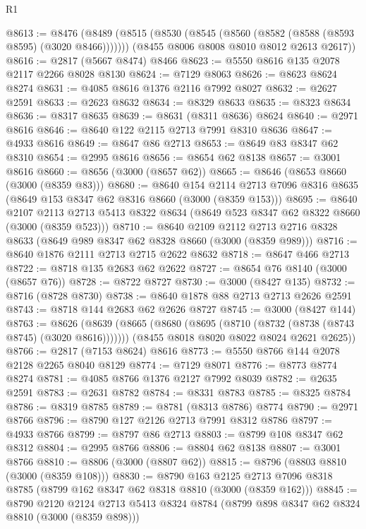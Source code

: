 \begin{lexlean}{R1}
\begin{coremodule}
@8613 := @8476
    (@8489
      (@8515 (@8530 (@8545 (@8560 (@8582 (@8588 (@8593 @8595) (@3020 @8466)))))))
      (@8455 @8006 @8008 @8010 @8012 @2613 @2617))
@8616 := @2817 (@5667 @8474) @8466
@8623 := @5550 @8616 @135 @2078 @2117 @2266 @8028 @8130
@8624 := @7129 @8063
@8626 := @8623 @8624 @8274
@8631 := @4085 @8616 @1376 @2116 @7992 @8027
@8632 := @2627 @2591
@8633 := @2623 @8632
@8634 := @8329 @8633
@8635 := @8323 @8634
@8636 := @8317 @8635
@8639 := @8631 (@8311 @8636) @8624
@8640 := @2971 @8616
@8646 := @8640 @122 @2115 @2713 @7991 @8310 @8636
@8647 := @4933 @8616
@8649 := @8647 @86 @2713
@8653 := @8649 @83 @8347 @62 @8310
@8654 := @2995 @8616
@8656 := @8654 @62 @8138
@8657 := @3001 @8616
@8660 := @8656 (@3000 (@8657 @62))
@8665 := @8646 (@8653 @8660 (@3000 (@8359 @83)))
@8680 := @8640
    @154
    @2114
    @2713
    @7096
    @8316
    @8635
    (@8649 @153 @8347 @62 @8316 @8660 (@3000 (@8359 @153)))
@8695 := @8640
    @2107
    @2113
    @2713
    @5413
    @8322
    @8634
    (@8649 @523 @8347 @62 @8322 @8660 (@3000 (@8359 @523)))
@8710 := @8640
    @2109
    @2112
    @2713
    @2716
    @8328
    @8633
    (@8649 @989 @8347 @62 @8328 @8660 (@3000 (@8359 @989)))
@8716 := @8640 @1876 @2111 @2713 @2715 @2622 @8632
@8718 := @8647 @466 @2713
@8722 := @8718 @135 @2683 @62 @2622
@8727 := @8654 @76 @8140 (@3000 (@8657 @76))
@8728 := @8722 @8727
@8730 := @3000 (@8427 @135)
@8732 := @8716 (@8728 @8730)
@8738 := @8640 @1878 @88 @2713 @2713 @2626 @2591
@8743 := @8718 @144 @2683 @62 @2626 @8727
@8745 := @3000 (@8427 @144)
@8763 := @8626
    (@8639
      (@8665 (@8680 (@8695 (@8710 (@8732 (@8738 (@8743 @8745) (@3020 @8616)))))))
      (@8455 @8018 @8020 @8022 @8024 @2621 @2625))
@8766 := @2817 (@7153 @8624) @8616
@8773 := @5550 @8766 @144 @2078 @2128 @2265 @8040 @8129
@8774 := @7129 @8071
@8776 := @8773 @8774 @8274
@8781 := @4085 @8766 @1376 @2127 @7992 @8039
@8782 := @2635 @2591
@8783 := @2631 @8782
@8784 := @8331 @8783
@8785 := @8325 @8784
@8786 := @8319 @8785
@8789 := @8781 (@8313 @8786) @8774
@8790 := @2971 @8766
@8796 := @8790 @127 @2126 @2713 @7991 @8312 @8786
@8797 := @4933 @8766
@8799 := @8797 @86 @2713
@8803 := @8799 @108 @8347 @62 @8312
@8804 := @2995 @8766
@8806 := @8804 @62 @8138
@8807 := @3001 @8766
@8810 := @8806 (@3000 (@8807 @62))
@8815 := @8796 (@8803 @8810 (@3000 (@8359 @108)))
@8830 := @8790
    @163
    @2125
    @2713
    @7096
    @8318
    @8785
    (@8799 @162 @8347 @62 @8318 @8810 (@3000 (@8359 @162)))
@8845 := @8790
    @2120
    @2124
    @2713
    @5413
    @8324
    @8784
    (@8799 @898 @8347 @62 @8324 @8810 (@3000 (@8359 @898)))

\end{coremodule}
\end{lexlean}
